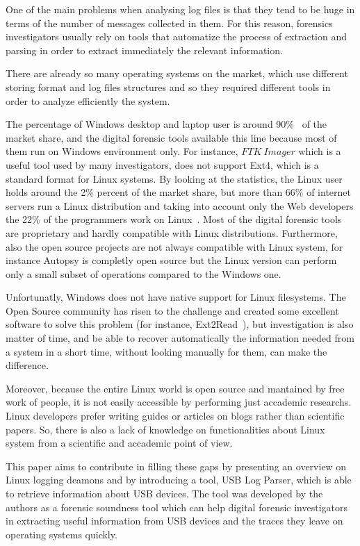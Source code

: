 \documentclass[a4paper]{article}
\begin{document}
One of the main problems when analysing log files is that they tend to be huge
in terms of the number of messages collected in them. For this reason, forensics
investigators usually rely on tools that automatize the process of extraction
and parsing in order to extract immediately the relevant information.

There are already so many operating systems on the market, which use different
storing format and log files structures and so they required different tools in
order to analyze efficiently the system.

The percentage of Windows desktop and laptop user is around 90\%~\cite{usagePC}
of the market share, and the digital forensic tools available this line because
most of them run on Windows environment only. For instance, $FTK~Imager$ which
is a useful tool used by many investigators, does not support Ext4, which is a
standard format for Linux systems. By looking at the statistics, the Linux user
holds around the 2\% percent of the market share, but more than 66\% of internet
servers run a Linux distribution and taking into account only the Web developers
the 22\% of the programmers work on Linux~\cite{usagePC}. Most of the digital
forensic tools are proprietary and hardly compatible with Linux distributions.
Furthermore, also the open source projects are not always compatible with Linux
system, for instance Autopsy is completly open source but the Linux version can
perform only a small subset of operations compared to the Windows one.

Unfortunatly, Windows does not have native support for Linux filesystems. The
Open Source community has risen to the challenge and created some excellent
software to solve this problem (for instance, Ext2Read~\cite{ext2read}), but
investigation is also matter of time, and be able to recover automatically the
information needed from a system in a short time, without looking manually for
them, can make the difference.

Moreover, because the entire Linux world is open source and mantained by free
work of people, it is not easily accessible by performing just accademic
researchs. Linux developers prefer writing guides or articles on blogs rather
than scientific papers. So, there is also a lack of knowledge on functionalities
about Linux system from a scientific and accademic point of view.

This paper aims to contribute in filling these gaps by presenting an overview on
Linux logging deamons and by introducing a tool, USB Log Parser, which is able
to retrieve information about USB devices. The tool was developed by the authors
as a forensic soundness tool which can help digital forensic investigators in
extracting useful information from USB devices and the traces they leave on
operating systems quickly.
\end{document}
